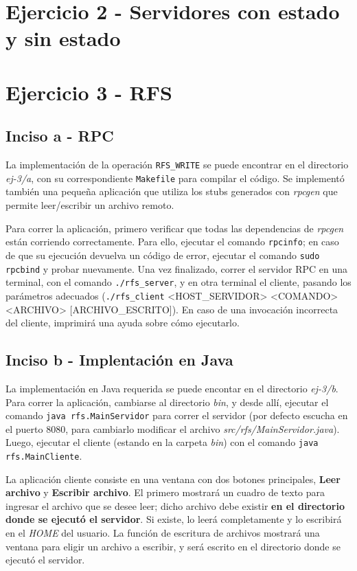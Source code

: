 \section{Ejercicio 2 - Servidores con estado y sin estado}

\section{Ejercicio 3 - RFS}

\subsection{Inciso a - RPC}

La implementación de la operación \texttt{RFS\_WRITE} se puede encontrar en el directorio \emph{ej-3/a}, con su correspondiente \texttt{Makefile} para compilar el código. Se implementó también una pequeña aplicación que utiliza los stubs generados con \emph{rpcgen} que permite leer/escribir un archivo remoto.

Para correr la aplicación, primero verificar que todas las dependencias de \emph{rpcgen} están corriendo correctamente. Para ello, ejecutar el comando \texttt{rpcinfo}; en caso de que su ejecución devuelva un código de error, ejecutar el comando \texttt{sudo rpcbind} y probar nuevamente. Una vez finalizado, correr el servidor RPC en una terminal, con el comando \texttt{./rfs\_server}, y en otra terminal el cliente, pasando los parámetros adecuados (\texttt{./rfs\_client} <HOST\_SERVIDOR> <COMANDO> <ARCHIVO> [ARCHIVO\_ESCRITO]). En caso de una invocación incorrecta del cliente, imprimirá una ayuda sobre cómo ejecutarlo.

\subsection{Inciso b - Implentación en Java}

La implementación en Java requerida se puede encontar en el directorio \emph{ej-3/b}. Para correr la aplicación, cambiarse al directorio \emph{bin}, y desde allí, ejecutar el comando \texttt{java rfs.MainServidor} para correr el servidor (por defecto escucha en el puerto 8080, para cambiarlo modificar el archivo \emph{src/rfs/MainServidor.java}). Luego, ejecutar el cliente (estando en la carpeta \emph{bin}) con el comando \texttt{java rfs.MainCliente}.

La aplicación cliente consiste en una ventana con dos botones principales, \textbf{Leer archivo} y \textbf{Escribir archivo}. El primero mostrará un cuadro de texto para ingresar el archivo que se desee leer; dicho archivo debe existir \textbf{en el directorio donde se ejecutó el servidor}. Si existe, lo leerá completamente y lo escribirá en el \emph{HOME} del usuario. La función de escritura de archivos mostrará una ventana para eligir un archivo a escribir, y será escrito en el directorio donde se ejecutó el servidor. 

